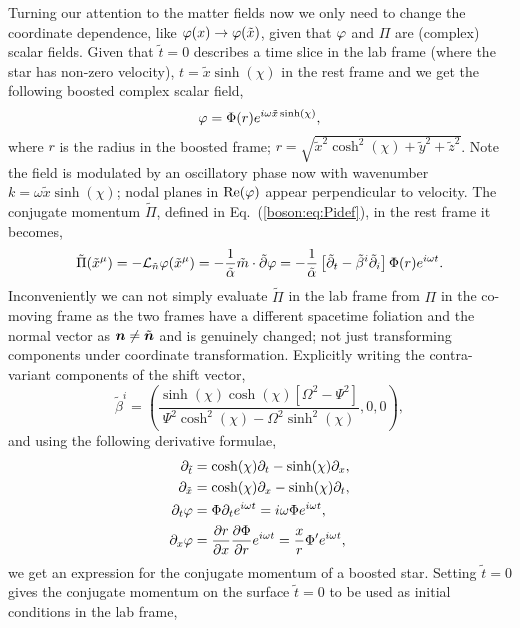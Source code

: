 Turning our attention to the matter fields now we only need to change the coordinate dependence, like $\varphi(x)\rightarrow \varphi(\tilde{x})$, given that $\varphi$ and $\Pi$ are (complex) scalar fields. Given that $\tilde{t}=0$ describes a time slice in the lab frame (where the star has non-zero velocity), $t = \tilde{x}\sinh(\chi)$ in the rest frame and we get the following boosted complex scalar field,
\begin{equation}\varphi = \Phi(r)e^{i\omega \tilde{x}\sinh(\chi)}, \end{equation}
where $r$ is the radius in the boosted frame; $r = \sqrt{\tilde{x}^2\cosh^2(\chi) +\tilde{y}^2 + \tilde{z}^2}$.
Note the field is modulated by an oscillatory phase now with wavenumber $k = \omega \tilde{x} \sinh(\chi)$; nodal planes in $\Re(\varphi)$ appear perpendicular to velocity. The conjugate momentum $\tilde{\Pi}$, defined in Eq.~(\ref{boson:eq:Pidef}), in the rest frame it becomes, 
\begin{equation} \tilde{\Pi}(\tilde{x}^\mu) = -\mathcal{L}_{\tilde{n}} \varphi(\tilde{x}^\mu)=-\frac{1}{\tilde{\alpha}}\tilde{m}\cdot \tilde{\partial}\varphi = -\frac{1}{\tilde{\alpha}}\left[ \tilde{\partial}_t - \tilde{\beta}^i\tilde{\partial}_{i}\right]\Phi(r)e^{i\omega t}.\end{equation}
Inconveniently we can not simply evaluate $\tilde{\Pi}$ in the lab frame from $\Pi$ in the co-moving frame as the two frames have a different spacetime foliation and the normal vector as $\boldsymbol{n}\neq \tilde{\boldsymbol{n}}$ and is genuinely changed; not just transforming components under coordinate transformation. Explicitly writing the contra-variant components of the shift vector, 
\begin{equation} \tilde{\beta}^i = \left(\frac{\sinh (\chi)  \cosh (\chi)  \left[\Omega ^2-\Psi ^2\right]}{\Psi ^2 \cosh
   ^2(\chi) -\Omega ^2 \sinh ^2(\chi) },0,0\right),\end{equation}
and using the following derivative formulae,
\begin{align} 
{\partial}_{\tilde{t}} &= \cosh(\chi) \partial_t - \sinh(\chi) \partial_x, \\
{\partial}_{\tilde{x}} &= \cosh(\chi) \partial_x - \sinh(\chi) \partial_t,\\
 \partial_t\varphi &=\Phi\partial_te^{i\omega t} =i\omega \Phi e^{i\omega t},\\
 \partial_x\varphi &=\frac{\partial r}{\partial x}\frac{\partial \Phi}{\partial r}e^{i\omega t} = \frac{x}{r}\Phi'e^{i\omega t} ,
 \end{align}
we get an expression for the conjugate momentum of a boosted star. Setting $\tilde{t}=0$ gives the conjugate momentum on the surface $\tilde{t}=0$ to be used as initial conditions in the lab frame, 
